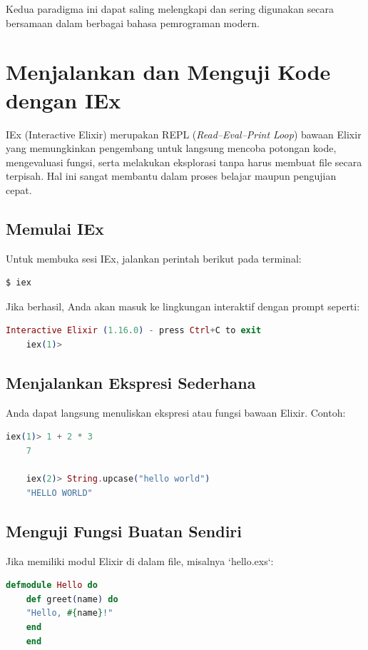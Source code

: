 Kedua paradigma ini dapat saling melengkapi dan sering digunakan secara bersamaan dalam berbagai bahasa pemrograman modern.


\section{Menjalankan dan Menguji Kode dengan IEx}

IEx (Interactive Elixir) merupakan REPL (\textit{Read--Eval--Print Loop}) bawaan Elixir yang memungkinkan pengembang untuk langsung mencoba potongan kode, mengevaluasi fungsi, serta melakukan eksplorasi tanpa harus membuat file secara terpisah. Hal ini sangat membantu dalam proses belajar maupun pengujian cepat.

\subsection{Memulai IEx}
Untuk membuka sesi IEx, jalankan perintah berikut pada terminal:

\begin{lstlisting}[language=Elixir]
	$ iex
\end{lstlisting}

Jika berhasil, Anda akan masuk ke lingkungan interaktif dengan prompt seperti:

\begin{lstlisting}[language=Elixir]
	Interactive Elixir (1.16.0) - press Ctrl+C to exit
	iex(1)>
\end{lstlisting}

\subsection{Menjalankan Ekspresi Sederhana}
Anda dapat langsung menuliskan ekspresi atau fungsi bawaan Elixir. Contoh:

\begin{lstlisting}[language=Elixir]
	iex(1)> 1 + 2 * 3
	7
	
	iex(2)> String.upcase("hello world")
	"HELLO WORLD"
\end{lstlisting}

\subsection{Menguji Fungsi Buatan Sendiri}
Jika memiliki modul Elixir di dalam file, misalnya `hello.exs`:

\begin{lstlisting}[language=Elixir]
	defmodule Hello do
	def greet(name) do
	"Hello, #{name}!"
	end
	end
\end{lstlisting}

